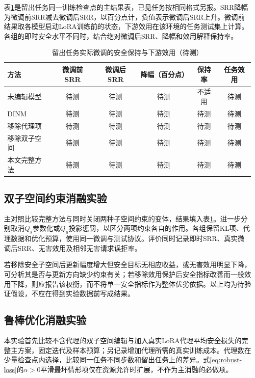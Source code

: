 表\ref{tab:ch2-ft-results}是留出任务同一训练检查点的主结果表，已见任务按相同格式另报。SRR降幅为微调前SRR减去微调后SRR，以百分点计，负值表示微调后SRR上升。微调前结果取各模型启动LoRA训练前的状态，下游效用在该环境的任务测试集上计算。各组的即时安全水平不同时，结合绝对微调后SRR、降幅和效用解释保持率。

\begin{table}[htbp]
 \centering
 \caption{留出任务实际微调的安全保持与下游效用（待测）}
 \label{tab:ch2-ft-results}
 \setlength{\tabcolsep}{4pt}
 \begin{tabular}{@{}lccccc@{}}
 \toprule
 方法 & 微调前SRR & 微调后SRR & 降幅（百分点） & 保持率 & 任务效用\\ \midrule
 未编辑模型 & 待测 & 待测 & 待测 & 不适用 & 待测\\
 DINM & 待测 & 待测 & 待测 & 待测 & 待测\\
 移除代理项 & 待测 & 待测 & 待测 & 待测 & 待测\\
 移除双子空间 & 待测 & 待测 & 待测 & 待测 & 待测\\
 本文完整方法 & 待测 & 待测 & 待测 & 待测 & 待测\\
 \bottomrule
 \end{tabular}
\end{table}

\subsection{双子空间约束消融实验}

主对照比较完整方法与同时关闭两种子空间约束的变体，结果填入表\ref{tab:ch2-ft-results}。进一步分别取消$Q_s$参数化或$Q_u$投影惩罚，以区分两项约束各自的作用。各组保留KL项、代理数据和优化预算，使用同一微调与测试协议。评价同时记录即时SRR、真实微调后SRR、无害效用及相邻无害请求误拒率。

若移除安全子空间后更新幅度增大但安全目标无相应收益，或无害效用明显下降，可分析其是否与更新方向缺少约束有关；若移除效用保护后安全指标改善而一般效用下降，则应报告该权衡，而不将单一安全指标作为整体优劣依据。以上均为待验证假设，不应在得到实验数据前写成结果。


\subsection{鲁棒优化消融实验}

本实验首先比较不含代理的双子空间编辑与加入真实LoRA代理平均安全损失的完整主方案，固定迭代及样本预算；另记录增加代理所需的真实训练成本。代理数在少量检查点内选择，比较同一任务不同步数和留出任务上的差异。式\eqref{eq:robust-loss}的$\alpha>0$平滑最坏情形项仅在资源允许时扩展，不作为主消融的必做项。

